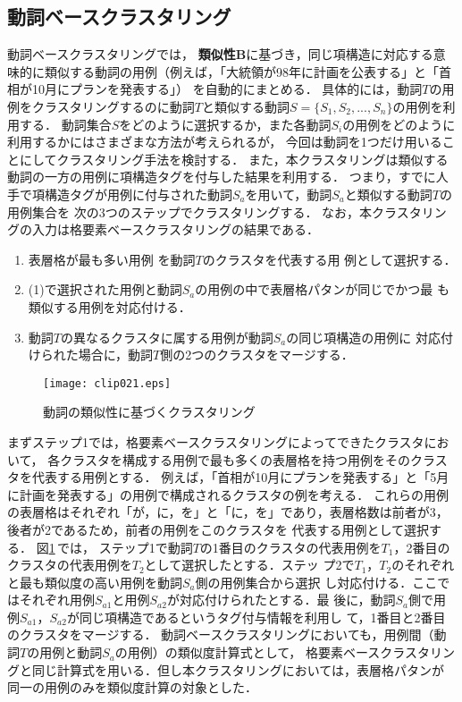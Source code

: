 \subsection{動詞ベースクラスタリング}
\label{ssec:clb}

動詞ベースクラスタリングでは，
{\bf 類似性B}に基づき，同じ項構造に対応する意味的に類似する動詞の用例（例えば，「大統領が98年に計画を公表する」と「首相が10月にプランを発表する」）
を自動的にまとめる．
具体的には，動詞$T$の用例をクラスタリングするのに動詞$T$と類似する動詞$S=\{S_{1},S_{2},...,S_{n}\}$の用例を利用する．
動詞集合$S$をどのように選択するか，また各動詞$S_{i}$の用例をどのように利用するかにはさまざまな方法が考えられるが，
今回は動詞を1つだけ用いることにしてクラスタリング手法を検討する．
また，本クラスタリングは類似する動詞の一方の用例に項構造タグを付与した結果を利用する．
つまり，すでに人手で項構造タグが用例に付与された動詞$S_{a}$を用いて，動詞$S_{a}$と類似する動詞$T$の用例集合を
次の3つのステップでクラスタリングする．
なお，本クラスタリングの入力は格要素ベースクラスタリングの結果である．\\

\begin{enumerate}
\item 表層格が最も多い用例
を動詞$T$のクラスタを代表する用
例として選択する．
\item (1)で選択された用例と動詞$S_{a}$の用例の中で表層格パタンが同じでかつ最
も類似する用例を対応付ける． 
\item 動詞$T$の異なるクラスタに属する用例が動詞$S_{a}$の同じ項構造の用例に
対応付けられた場合に，動詞$T$側の2つのクラスタをマージする．\\
\end{enumerate}

\begin{figure}[t]
  \begin{center}
        \texttt{[image: clip021.eps]}
  \end{center}
  \caption{動詞の類似性に基づくクラスタリング}
  \label{fig:step3}
\end{figure}

まずステップ1では，格要素ベースクラスタリングによってできたクラスタにおいて，
各クラスタを構成する用例で最も多くの表層格を持つ用例をそのクラスタを代表する用例とする．
例えば，「首相が10月にプランを発表する」と「5月に計画を発表する」の用例で構成されるクラスタの例を考える．
これらの用例の表層格はそれぞれ「が，に，を」と「に，を」であり，表層格数は前者が3，後者が2であるため，前者の用例をこのクラスタを
代表する用例として選択する．
図\ref{fig:step3}\,では，
ステップ1で動詞$T$の1番目のクラスタの代表用例を$T_{1}$，2番目のクラスタの代表用例を$T_{2}$として選択したとする．ステッ
プ2で$T_{1}$，$T_{2}$のそれぞれと最も類似度の高い用例を動詞$S_{a}$側の用例集合から選択
し対応付ける．ここではそれぞれ用例$S_{a1}$と用例$S_{a2}$が対応付けられたとする．最
後に，動詞$S_{a}$側で用例$S_{a1}$，$S_{a2}$が同じ項構造であるというタグ付与情報を利用し
て，1番目と2番目のクラスタをマージする．
動詞ベースクラスタリングにおいても，用例間（動詞$T$の用例と動詞$S_{a}$の用例）の類似度計算式として，
格要素ベースクラスタリングと同じ計算式を用いる．但し本クラスタリングにおいては，表層格パタンが
同一の用例のみを類似度計算の対象とした．


